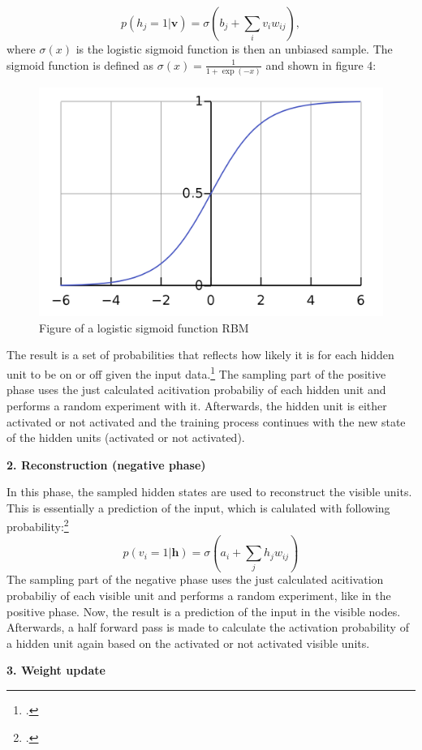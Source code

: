 \begin{equation}
p(h_j = 1 | \textbf{v}) = \sigma(b_j + \sum_i v_i w_{ij}),
\end{equation}
where $\sigma(x)$ is the logistic sigmoid function is then an unbiased sample. The sigmoid function is defined as $\sigma(x) = \frac{1}{1 + \exp(-x)}$ and shown in figure 4:
\begin{figure}[H]
    \centering
    \includegraphics[width=0.5\linewidth]{graphics/logistic_sigmoid.png}
    \caption{Figure of a logistic sigmoid function \ac{RBM}}
\end{figure}
The result is a set of probabilities that reflects how likely it is for each hidden unit to be on or off given the input data.\footcite[Vgl.][6]{huembeliPhysicsEnergybasedModels2022}
The sampling part of the positive phase uses the just calculated acitivation probabiliy of each hidden unit and performs a random experiment with it.
Afterwards, the hidden unit is either activated or not activated and the training process continues with the new state of the hidden units (activated or not activated).

\textbf{2. Reconstruction (negative phase)}

In this phase, the sampled hidden states are used to reconstruct the visible units. 
This is essentially a prediction of the input, which is calulated with following probability:\footcite[Vgl.][6]{hintonPracticalGuideTraining2012}
\begin{equation}
    p(v_i = 1 | \mathbf{h}) = \sigma(a_i + \sum_j h_j w_{ij})
\end{equation}
The sampling part of the negative phase uses the just calculated acitivation probabiliy
of each visible unit and performs a random experiment, like in the positive phase.
Now, the result is a prediction of the input in the visible nodes.
Afterwards, a half forward pass is made to calculate the activation probability of a hidden unit again based on the activated or not activated visible units.

\textbf{3. Weight update}

